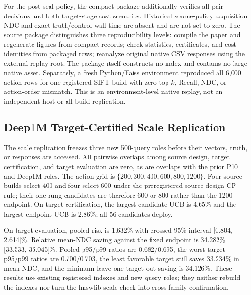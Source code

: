 \documentclass[sigconf,anonymous]{acmart}
\begin{document}
For the post-seal policy, the compact package additionally verifies all pair decisions and both target-stage cost scenarios. Historical source-policy acquisition NDC and exact-truth/control wall time are absent and are not set to zero. The source package distinguishes three reproducibility levels: compile the paper and regenerate figures from compact records; check statistics, certificates, and cost identities from packaged rows; reanalyze original native CSV responses using the external replay root. The package itself constructs no index and contains no large native asset. Separately, a fresh Python/Faiss environment reproduced all 6,000 action rows for one registered SIFT build with zero top-$k$, Recall, NDC, or action-order mismatch. This is an environment-level native replay, not an independent host or all-build replication.

\subsection{Deep1M Target-Certified Scale Replication}
The scale replication freezes three new 500-query roles before their vectors, truth, or responses are accessed. All pairwise overlaps among source design, target certification, and target evaluation are zero, as are overlaps with the prior P10 and Deep1M roles. The action grid is $\{200,300,400,600,800,1200\}$. Four source builds select 400 and four select 600 under the preregistered source-design CP rule; their one-rung candidates are therefore 600 or 800 rather than the 1200 endpoint. On target certification, the largest candidate UCB is 4.65\% and the largest endpoint UCB is 2.86\%; all 56 candidates deploy.

On target evaluation, pooled risk is 1.632\% with crossed 95\% interval [0.804, 2.614]\%. Relative mean-NDC saving against the fixed endpoint is 34.282\% [33.533, 35.045]\%. Pooled p95/p99 ratios are 0.682/0.695, the worst-target p95/p99 ratios are 0.700/0.703, the least favorable target still saves 33.234\% in mean NDC, and the minimum leave-one-target-out saving is 34.126\%. These results use existing registered indexes and new query roles; they neither rebuild the indexes nor turn the hnswlib scale check into cross-family confirmation.
\end{document}
